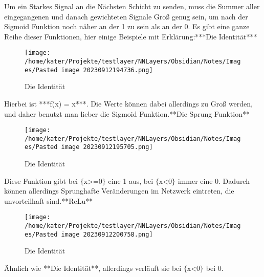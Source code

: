 \documentclass[12pt]{article}
\begin{document}
Um ein Starkes Signal an die Nächsten Schicht zu senden, muss die Summer aller eingegangenen und danach gewichteten Signale Groß genug sein, um nach der Sigmoid Funktion noch näher an der 1 zu sein als an der 0. 
Es gibt eine ganze Reihe dieser Funktionen, hier einige Beispiele mit Erklärung:***Die Identität***
\begin{figure}[H]
\centering
\texttt{[image: /home/kater/Projekte/testlayer/NNLayers/Obsidian/Notes/Images/Pasted image 20230912194736.png]}
\caption{Die Identität}
\label{Was kommt hier rein?}\end{figure}
Hierbei ist ***f(x) = x***. Die Werte können dabei allerdings zu Groß werden, und daher benutzt man lieber die Sigmoid Funktion.**Die Sprung Funktion**
\begin{figure}[H]
\centering
\texttt{[image: /home/kater/Projekte/testlayer/NNLayers/Obsidian/Notes/Images/Pasted image 20230912195705.png]}
\caption{Die Identität}
\label{Was kommt hier rein?}\end{figure}
Diese Funktion gibt bei $\text{\{x>=0\}}$ eine 1 aus, bei $\text{\{x<0\}}$ immer eine 0.
Dadurch können allerdings Sprunghafte Veränderungen im Netzwerk eintreten, die unvorteilhaft sind.**ReLu**
\begin{figure}[H]
\centering
\texttt{[image: /home/kater/Projekte/testlayer/NNLayers/Obsidian/Notes/Images/Pasted image 20230912200758.png]}
\caption{Die Identität}
\label{Was kommt hier rein?}\end{figure}
Ähnlich wie **Die Identität**, allerdings verläuft sie bei $\text{\{x<0\}}$ bei 0.
\end{document}
